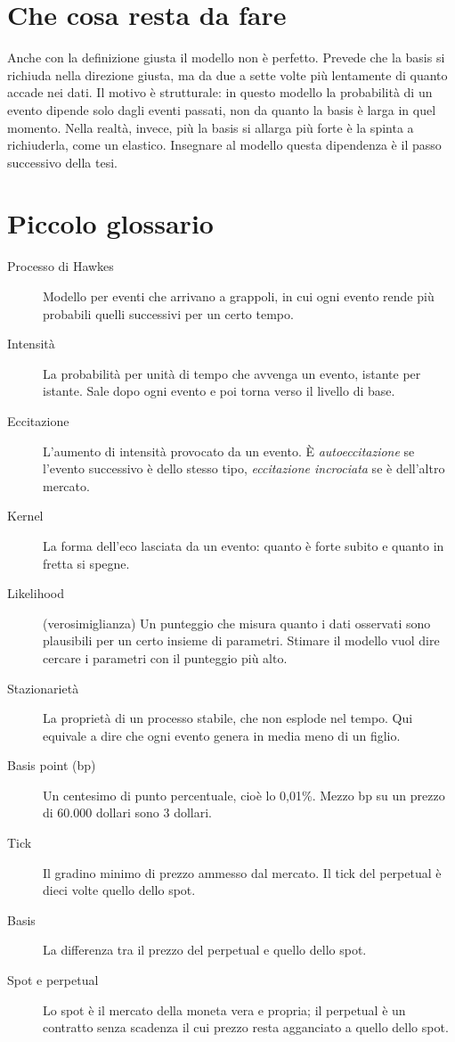 \documentclass[a4paper,11pt]{article}
\begin{document}
\section*{Che cosa resta da fare}

Anche con la definizione giusta il modello non è perfetto. Prevede che la basis si richiuda nella direzione giusta, ma da due a sette volte più lentamente di quanto accade nei dati. Il motivo è strutturale: in questo modello la probabilità di un evento dipende solo dagli eventi passati, non da quanto la basis è larga in quel momento. Nella realtà, invece, più la basis si allarga più forte è la spinta a richiuderla, come un elastico. Insegnare al modello questa dipendenza è il passo successivo della tesi.

\section*{Piccolo glossario}

\begin{description}
\item[Processo di Hawkes] Modello per eventi che arrivano a grappoli, in cui ogni evento rende più probabili quelli successivi per un certo tempo.
\item[Intensità] La probabilità per unità di tempo che avvenga un evento, istante per istante. Sale dopo ogni evento e poi torna verso il livello di base.
\item[Eccitazione] L'aumento di intensità provocato da un evento. È \emph{autoeccitazione} se l'evento successivo è dello stesso tipo, \emph{eccitazione incrociata} se è dell'altro mercato.
\item[Kernel] La forma dell'eco lasciata da un evento: quanto è forte subito e quanto in fretta si spegne.
\item[Likelihood] (verosimiglianza) Un punteggio che misura quanto i dati osservati sono plausibili per un certo insieme di parametri. Stimare il modello vuol dire cercare i parametri con il punteggio più alto.
\item[Stazionarietà] La proprietà di un processo stabile, che non esplode nel tempo. Qui equivale a dire che ogni evento genera in media meno di un figlio.
\item[Basis point (bp)] Un centesimo di punto percentuale, cioè lo 0,01\%. Mezzo bp su un prezzo di 60.000 dollari sono 3 dollari.
\item[Tick] Il gradino minimo di prezzo ammesso dal mercato. Il tick del perpetual è dieci volte quello dello spot.
\item[Basis] La differenza tra il prezzo del perpetual e quello dello spot.
\item[Spot e perpetual] Lo spot è il mercato della moneta vera e propria; il perpetual è un contratto senza scadenza il cui prezzo resta agganciato a quello dello spot.
\end{description}
\end{document}
